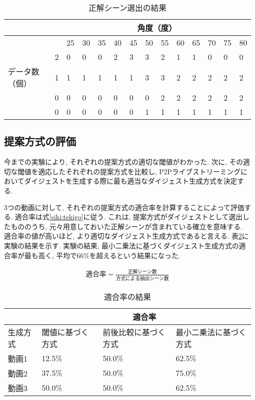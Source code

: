 \begin{table}[h]
  \caption{正解シーン選出の結果}
  \label{tbl:digest3-1}
  \centering
      {\small
        \begin{tabular}{|l|l||l|l|l|l|l|l|l|l|l|l|l|l|} \hline
          & & \multicolumn{12}{|c|}{角度（度）} \\ \hline
          & & 25 & 30 & 35 & 40 & 45 & 50 & 55 & 60 & 65 & 70 & 75 & 80 \\ \hline \hline
          & 2 & 0 & 0 & 0 & 2 & 3 & 3 & 2 & 1 & 1 & 0 & 0 & 0 \\ \cline{2-14}
          データ数（個） & 1 & 1 & 1 & 1 & 1 & 1 & 3 & 3 & 2 & 2 & 2 & 2 & 2 \\ \cline{2-14}
          & 0 & 0 & 0 & 0 & 0 & 0 & 0 & 2 & 2 & 2 & 2 & 2 & 2 \\ \cline{2-14}
          & 0 & 0 & 0 & 0 & 0 & 0 & 1 & 1 & 1 & 1 & 1 & 1 & 1 \\ \cline{2-14}
          \hline
        \end{tabular}
      }
\end{table}

\subsection{提案方式の評価}
今までの実験により, それぞれの提案方式の適切な閾値がわかった. 次に, その適切な閾値を適応したそれぞれの提案方式を比較し, P2Pライブストリーミングにおいてダイジェストを生成する際に最も適当なダイジェスト生成方式を決定する.

3つの動画に対して, それぞれの提案方式の適合率を計算することによって評価する. 適合率は式\ref{siki:tekigo}に従う. これは, 提案方式がダイジェストとして選出したもののうち, 元々用意しておいた正解シーンが含まれている確立を意味する. 適合率の値が高いほど, より適切なダイジェスト生成方式であると言える. 表\ref{tbl:tekigo}に実験の結果を示す. 実験の結果, 最小二乗法に基づくダイジェスト生成方式の適合率が最も高く, 平均で66\%を超えるという結果になった.

\begin{eqnarray}
  適合率 = \frac{正解シーン数}{方式による抽出シーン数}
  \label{siki:tekigo}
\end{eqnarray}

\begin{table}[h]
  \caption{適合率の結果}
  \label{tbl:tekigo}
  \centering
      {\small
        \begin{tabular}{|l|l|l|l|} \hline
          & \multicolumn{3}{|c|}{適合率} \\ \hline
          生成方式 & 閾値に基づく方式 & 前後比較に基づく方式 & 最小二乗法に基づく方式 \\ \hline
          動画1 & 12.5\% & 50.0\% & 62.5\% \\ \hline
          動画2 & 37.5\% & 50.0\% & 75.0\% \\ \hline
          動画3 & 50.0\% & 50.0\% & 62.5\% \\ \hline
        \end{tabular}
      }
\end{table}


